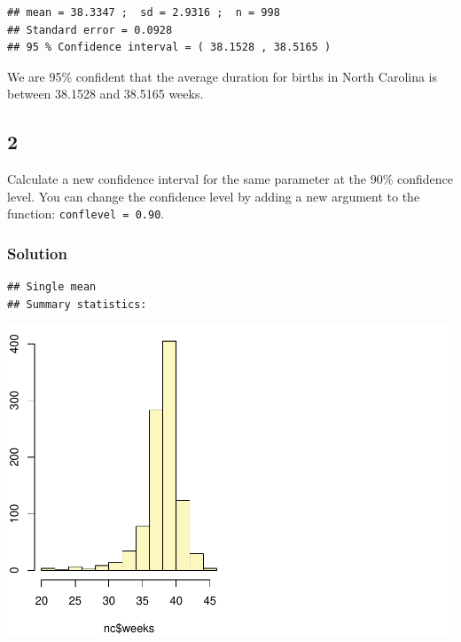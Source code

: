 \documentclass[]{article}
\newenvironment{Shaded}{\begin{snugshade}}{\end{snugshade}}
\newcommand{\KeywordTok}[1]{\textcolor[rgb]{0.13,0.29,0.53}{\textbf{#1}}}
\newcommand{\DataTypeTok}[1]{\textcolor[rgb]{0.13,0.29,0.53}{#1}}
\newcommand{\DecValTok}[1]{\textcolor[rgb]{0.00,0.00,0.81}{#1}}
\newcommand{\FloatTok}[1]{\textcolor[rgb]{0.00,0.00,0.81}{#1}}
\newcommand{\StringTok}[1]{\textcolor[rgb]{0.31,0.60,0.02}{#1}}
\newcommand{\OperatorTok}[1]{\textcolor[rgb]{0.81,0.36,0.00}{\textbf{#1}}}
\newcommand{\NormalTok}[1]{#1}
\begin{document}
\begin{verbatim}
## mean = 38.3347 ;  sd = 2.9316 ;  n = 998 
## Standard error = 0.0928 
## 95 % Confidence interval = ( 38.1528 , 38.5165 )
\end{verbatim}

We are 95\% confident that the average duration for births in North
Carolina is between 38.1528 and 38.5165 weeks.

\subsection{2}\label{section-1}

Calculate a new confidence interval for the same parameter at the 90\%
confidence level. You can change the confidence level by adding a new
argument to the function: \texttt{conflevel\ =\ 0.90}.

\subsubsection{Solution}\label{solution-6}

\begin{Shaded}
\end{Shaded}

\begin{verbatim}
## Single mean 
## Summary statistics:
\end{verbatim}

\includegraphics{DATA_606_Lab_5_files/figure-latex/unnamed-chunk-7-1.pdf}
\end{document}
